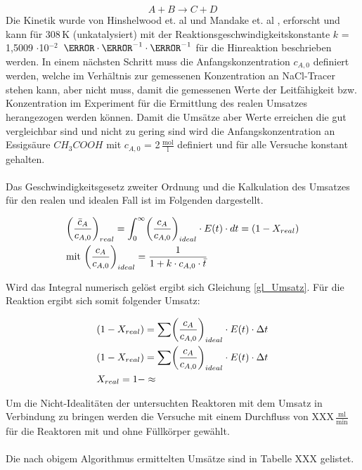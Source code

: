 \documentclass[12pt,liststotoc]{report}
\begin{document}
\begin{equation*}
    A + B \rightarrow C + D
\end{equation*}
\noindent
Die Kinetik wurde von Hinshelwood et. al und Mandake et. al \cite{Rolfe1934}, \cite{mandake2013kinetic} erforscht und kann für 308\,K (unkatalysiert) mit der Reaktionsgeschwindigkeitskonstante $k$ = 1,5009 $\cdot  $10$^{-2}$\, $\litre\cdot\mole^{-1}\cdot\s^{-1}$ für die Hinreaktion beschrieben werden. In einem nächsten Schritt muss die Anfangskonzentration $c_{A,0}$ definiert werden, welche im Verhältnis zur gemessenen Konzentration an NaCl-Tracer stehen kann, aber nicht muss, damit die gemessenen Werte der Leitfähigkeit bzw. Konzentration im Experiment für die Ermittlung des realen Umsatzes herangezogen werden können. Damit die Umsätze aber Werte erreichen die gut vergleichbar sind und nicht zu gering sind wird die Anfangskonzentration an Essigsäure $CH_3COOH$ mit $c_{A,0}$ = 2\,$\frac{\text{mol}}{\text{l}}$ definiert und für alle Versuche konstant gehalten. 
\\
\\
Das Geschwindigkeitsgesetz zweiter Ordnung und die Kalkulation des Umsatzes für den realen und idealen Fall ist im Folgenden dargestellt.

\begin{align}
&\biggl(\frac{\bar{c}_A}{c_{A,0}}\biggr)_{real} = \int_{0}^{\infty} \biggl(\frac{{c}_A}{c_{A,0}}\biggr)_{ideal} \cdot E(t)\cdot dt = (1-X_{real})\\
&\text{mit } \biggl(\frac{{c}_A}{c_{A,0}}\biggr)_{ideal} = \frac{1}{1+k\cdot c_{A,0}\cdot \bar{t}}\notag
\end{align}

Wird das Integral numerisch gelöst ergibt sich Gleichung \ref{gl_Umsatz}. Für die Reaktion ergibt sich somit folgender Umsatz:

\begin{align}
& (1-X_{real}) = \sum \biggl(\frac{{c}_A}{c_{A,0}}\biggr)_{ideal} \cdot E(t)\cdot \Delta t\\ \label{gl_Umsatz}
& (1-X_{real}) = \sum \biggl(\frac{{c}_A}{c_{A,0}}\biggr)_{ideal} \cdot E(t)\cdot \Delta t\\ \notag
& X_{real} = 1- \approx \notag
\end{align}

Um die Nicht-Idealitäten der untersuchten Reaktoren mit dem Umsatz in Verbindung zu bringen werden die Versuche mit einem Durchfluss von XXX\,$\frac{\text{ml}}{\text{min}}$ für die Reaktoren mit und ohne Füllkörper gewählt.
\\
\\
Die nach obigem Algorithmus ermittelten Umsätze sind in Tabelle XXX gelistet.
\end{document}
